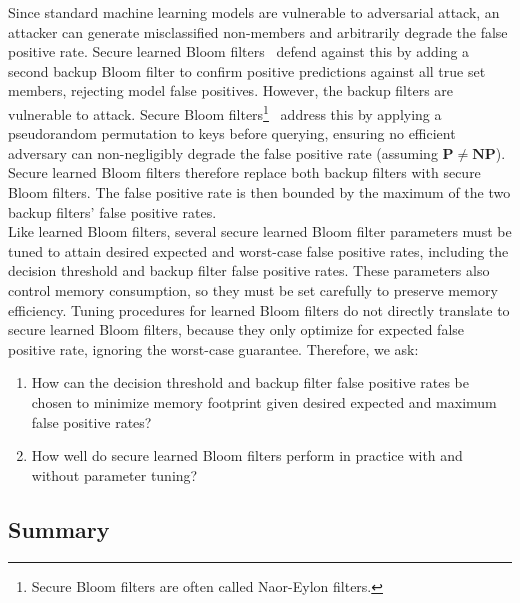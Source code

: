 

\noindent
Since standard machine learning models are vulnerable to adversarial attack, an attacker can generate misclassified non-members and arbitrarily degrade the 
false positive rate. Secure learned Bloom filters~\cite{almashaqbeh2026} defend against this by adding a second backup Bloom filter to confirm positive 
predictions against all true set members, rejecting model false positives. However, the backup filters are vulnerable to attack. Secure Bloom 
filters\footnote{Secure Bloom filters are often called Naor-Eylon filters.}~\cite{almashaqbeh2026} address this by applying a pseudorandom permutation to keys 
before querying, ensuring no efficient adversary can non-negligibly degrade the false positive rate (assuming $\mathbf{P} \neq \mathbf{NP}$). Secure learned 
Bloom filters therefore replace both backup filters with secure Bloom filters. The false positive rate is then bounded by the maximum of the two backup filters'
false positive rates. \\



\noindent
Like learned Bloom filters, several secure learned Bloom filter parameters must be tuned to attain desired expected and worst-case false positive rates, 
including the decision threshold and backup filter false positive rates. These parameters also control memory consumption, so they must be set carefully to 
preserve memory efficiency. Tuning procedures for learned Bloom filters do not directly translate to secure learned Bloom filters, because they only optimize 
for expected false positive rate, ignoring the worst-case guarantee. Therefore, we ask:
\begin{enumerate}
    \item How can the decision threshold and backup filter false positive rates be chosen to minimize memory footprint given desired expected and maximum false 
    positive rates?
    \item How well do secure learned Bloom filters perform in practice with and without parameter tuning?
\end{enumerate}

\subsection{Summary}

